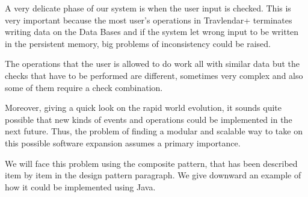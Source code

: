 A very delicate phase of our system is when the user input is checked. This is very important because the most user’s operations in Travlendar+ terminates writing data on the Data Bases and if the system let wrong input to be written in the persistent memory, big problems of inconsistency could be raised.

The operations that the user is allowed to do work all with similar data but the checks that have to be performed are different, sometimes very complex and also some of them require a check combination.

Moreover, giving a quick look on the rapid world evolution, it sounds quite possible that new kinds of events and operations could be implemented in the next future. Thus, the problem of finding a modular and scalable way to take on this possible software expansion assumes a primary importance.

We will face this problem using the composite pattern, that has been described item by item in the design pattern paragraph. We give downward an example of how it could be implemented using Java.



\newpage
{}




\newpage
{}




\newpage
{}

